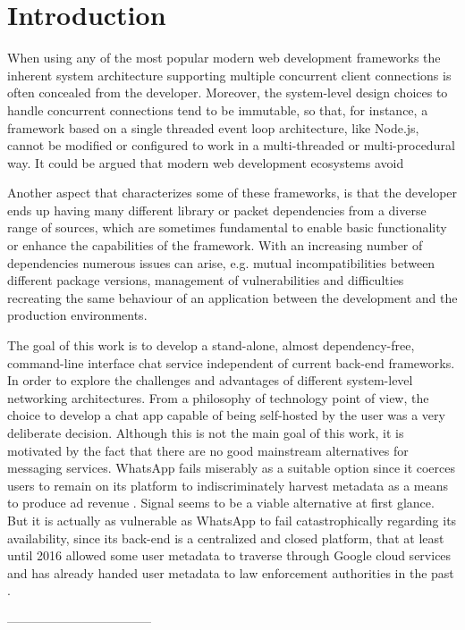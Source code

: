 \section{Introduction}
When using any of the most popular modern web development frameworks the inherent system architecture supporting multiple concurrent client connections is often concealed from the developer. Moreover, the system-level design choices to handle concurrent connections tend to be immutable, so that, for instance, a framework based on a single threaded event loop architecture, like Node.js, cannot be modified or configured to work in a multi-threaded or multi-procedural way. It could be argued that modern web development ecosystems avoid 

Another aspect that characterizes some of these frameworks, is that the developer ends up having many different library or packet dependencies from a diverse range of sources, which are sometimes fundamental to enable basic functionality or enhance the capabilities of the framework. With an increasing number of dependencies numerous issues can arise, e.g. mutual incompatibilities between different package versions, management of vulnerabilities and difficulties recreating the same behaviour of an application between the development and the production environments. 

The goal of this work is to develop a stand-alone, almost dependency-free, command-line interface chat service independent of current back-end frameworks. In order to explore the challenges and advantages of different system-level networking architectures. From a philosophy of technology point of view, the choice to develop a chat app capable of being self-hosted by the user was a very deliberate decision. Although this is not the main goal of this work, it is motivated by the fact that there are no good mainstream alternatives for messaging services. WhatsApp fails miserably as a suitable option since it coerces users to remain on its platform to indiscriminately harvest metadata as a means to produce ad revenue \cite{Kumar2021}. Signal seems to be a viable alternative at first glance. But it is actually as vulnerable as WhatsApp to fail catastrophically regarding its availability, since its back-end is a centralized and closed platform, that at least until 2016 allowed some user metadata to traverse through Google cloud services \cite{Edge2016} and has already handed user metadata to law enforcement authorities in the past \cite{Kaufman2016}. 

-----------------------------------

